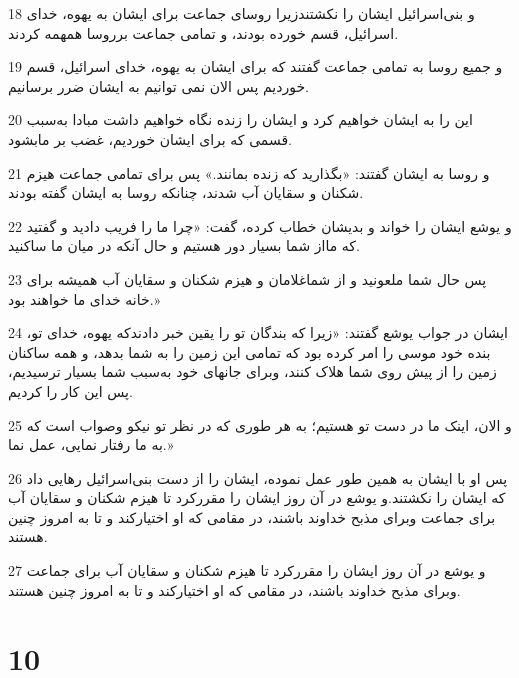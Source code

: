 \par 18 و بنی‌اسرائیل ایشان را نکشتندزیرا روسای جماعت برای ایشان به یهوه، خدای اسرائیل، قسم خورده بودند، و تمامی جماعت برروسا همهمه کردند.
\par 19 و جمیع روسا به تمامی جماعت گفتند که برای ایشان به یهوه، خدای اسرائیل، قسم خوردیم پس الان نمی توانیم به ایشان ضرر برسانیم.
\par 20 این را به ایشان خواهیم کرد و ایشان را زنده نگاه خواهیم داشت مبادا به‌سبب قسمی که برای ایشان خوردیم، غضب بر مابشود.
\par 21 و روسا به ایشان گفتند: «بگذارید که زنده بمانند.» پس برای تمامی جماعت هیزم شکنان و سقایان آب شدند، چنانکه روسا به ایشان گفته بودند.
\par 22 و یوشع ایشان را خواند و بدیشان خطاب کرده، گفت: «چرا ما را فریب دادید و گفتید که مااز شما بسیار دور هستیم و حال آنکه در میان ما ساکنید.
\par 23 پس حال شما ملعونید و از شماغلامان و هیزم شکنان و سقایان آب همیشه برای خانه خدای ما خواهند بود.»
\par 24 ایشان در جواب یوشع گفتند: «زیرا که بندگان تو را یقین خبر دادندکه یهوه، خدای تو، بنده خود موسی را امر کرده بود که تمامی این زمین را به شما بدهد، و همه ساکنان زمین را از پیش روی شما هلاک کنند، وبرای جانهای خود به‌سبب شما بسیار ترسیدیم، پس این کار را کردیم.
\par 25 و الان، اینک ما در دست تو هستیم؛ به هر طوری که در نظر تو نیکو وصواب است که به ما رفتار نمایی، عمل نما.»
\par 26 پس او با ایشان به همین طور عمل نموده، ایشان را از دست بنی‌اسرائیل رهایی داد که ایشان را نکشتند.و یوشع در آن روز ایشان را مقررکرد تا هیزم شکنان و سقایان آب برای جماعت وبرای مذبح خداوند باشند، در مقامی که او اختیارکند و تا به امروز چنین هستند.
\par 27 و یوشع در آن روز ایشان را مقررکرد تا هیزم شکنان و سقایان آب برای جماعت وبرای مذبح خداوند باشند، در مقامی که او اختیارکند و تا به امروز چنین هستند. 
 
\chapter{10}

